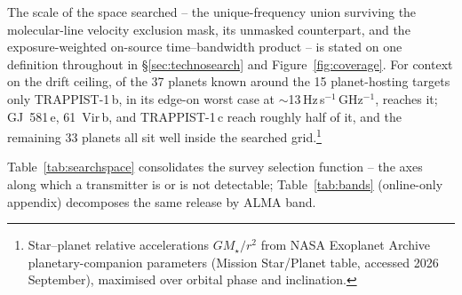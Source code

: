 \documentclass{openjournal}
\begin{document}
The scale of the space searched -- the unique-frequency union
surviving the molecular-line velocity exclusion mask, its unmasked
counterpart, and the exposure-weighted on-source time--bandwidth
product -- is stated on one definition throughout in
\S\ref{sec:technosearch} and Figure~\ref{fig:coverage}. For context
on the drift ceiling, of the
37 planets known around the 15 planet-hosting targets only
TRAPPIST-1\,b, in its edge-on worst case at
$\sim$13\,Hz\,s$^{-1}$\,GHz$^{-1}$, reaches it; GJ~581\,e,
61~Vir\,b, and TRAPPIST-1\,c reach roughly half of it, and the
remaining 33 planets all sit well inside the searched
grid.\footnote{Star--planet relative accelerations $GM_\star/r^{2}$
from NASA Exoplanet Archive planetary-companion parameters (Mission
Star/Planet table, accessed 2026 September), maximised over orbital
phase and inclination.}

Table~\ref{tab:searchspace} consolidates the survey selection
function -- the axes along which a transmitter is or is not
detectable; Table~\ref{tab:bands} (online-only appendix) decomposes
the same release by ALMA band.
\end{document}
